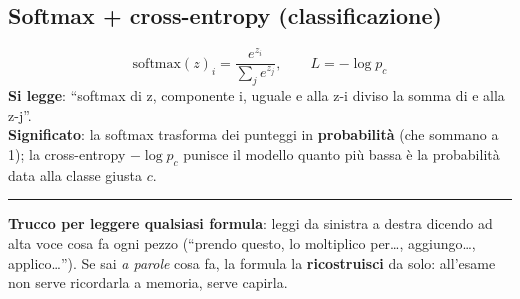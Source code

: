 \documentclass[11pt,a4paper]{article}
\begin{document}
\subsection*{Softmax + cross-entropy (classificazione)}
\[ \text{softmax}(z)_i = \frac{e^{z_i}}{\sum_j e^{z_j}}, \qquad L = -\log p_c \]
\textbf{Si legge}: \enquote{softmax di z, componente i, uguale e alla z-i diviso la
somma di e alla z-j}.\\
\textbf{Significato}: la softmax trasforma dei punteggi in \textbf{probabilità}
(che sommano a 1); la cross-entropy $-\log p_c$ punisce il modello quanto più
bassa è la probabilità data alla classe giusta $c$.

\vspace{1em}
\hrule
\vspace{6pt}
\textbf{Trucco per leggere qualsiasi formula}: leggi da sinistra a destra dicendo
ad alta voce cosa fa ogni pezzo (\enquote{prendo questo, lo moltiplico per\dots,
aggiungo\dots, applico\dots}). Se sai \emph{a parole} cosa fa, la formula la
\textbf{ricostruisci} da solo: all'esame non serve ricordarla a memoria, serve
capirla.
\end{document}
